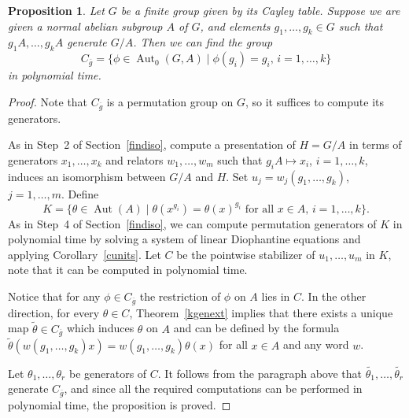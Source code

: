 \documentclass{article}
\newtheorem{proposition}[theorem]{Proposition}
\DeclareMathOperator{\Aut}{Aut}
\begin{document}
\begin{proposition}\label{gensfixed}
	Let \( G \) be a finite group given by its Cayley table.
	Suppose we are given a normal abelian subgroup \( A \) of \( G \), and elements \( g_1, \dots, g_k \in G \)
	such that \( g_1A, \dots, g_kA \) generate \( G/A \).
	Then we can find the group
	\[ C_{\overline{g}} = \{ \phi \in \Aut_0(G, A) \mid \phi(g_i) = g_i,\, i = 1, \dots, k \} \]
	in polynomial time.
\end{proposition}
\begin{proof}
	Note that \( C_{\overline{g}} \) is a permutation group on \( G \), so it suffices to compute its generators.

	As in Step~2 of Section~\ref{findiso}, compute a presentation of \( H = G/A \) in terms of generators \( x_1, \dots, x_k \) and relators \( w_1, \dots, w_m \)
	such that \( g_iA \mapsto x_i \), \( i = 1, \dots, k \), induces an isomorphism between \( G/A \) and \( H \).
	Set \( u_j = w_j(g_1, \dots, g_k) \), \( j = 1, \dots, m \). Define
	\[ K = \{ \theta \in \Aut(A) \mid \theta(x^{g_i}) = \theta(x)^{g_i} \text{ for all } x \in A,\, i = 1, \dots, k \}. \]
	As in Step~4 of Section~\ref{findiso}, we can compute permutation generators of \( K \) in polynomial time
	by solving a system of linear Diophantine equations and applying Corollary~\ref{cunits}.
	Let \( C \) be the pointwise stabilizer of \( u_1, \dots, u_m \) in \( K \), note that it can be computed in polynomial time.

	Notice that for any \( \phi \in C_{\overline{g}} \) the restriction of \( \phi \) on \( A \) lies in \( C \).
	In the other direction, for every \( \theta \in C \), Theorem~\ref{kgenext} implies that there exists a unique map \( \tilde{\theta} \in C_{\overline{g}} \)
	which induces \( \theta \) on \( A \) and can be defined by the formula \( \tilde{\theta}(w(g_1, \dots, g_k)x) = w(g_1, \dots, g_k)\theta(x) \)
	for all \( x \in A \) and any word \( w \).

	Let \( \theta_1, \dots, \theta_r \) be generators of \( C \).
	It follows from the paragraph above that \( \tilde{\theta_1}, \dots, \tilde{\theta_r} \) generate \( C_{\overline{g}} \),
	and since all the required computations can be performed in polynomial time, the proposition is proved.
\end{proof}
\end{document}
